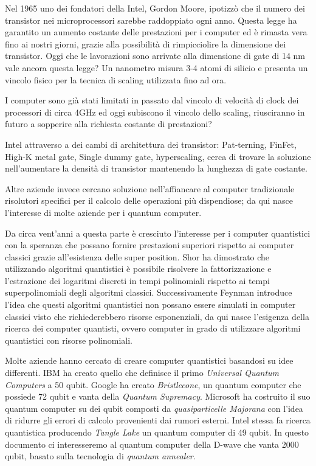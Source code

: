 \cite{S24}Nel 1965 uno dei fondatori della Intel, Gordon Moore, ipotizzò che il numero dei transistor nei microprocessori sarebbe raddoppiato ogni anno. Questa legge ha garantito un aumento costante delle prestazioni per i computer ed è rimasta vera fino ai nostri giorni, grazie alla possibilità di rimpicciolire la dimensione dei transistor. Oggi che le lavorazioni sono arrivate alla dimensione di gate di 14 nm vale ancora questa legge? Un nanometro misura 3-4 atomi di silicio e presenta un vincolo fisico per la tecnica di scaling utilizzata fino ad ora.

I computer sono già stati limitati in passato dal vincolo di velocità di clock dei processori di circa 4GHz ed oggi subiscono il vincolo dello scaling, riusciranno in futuro a sopperire alla richiesta costante di prestazioni?

Intel attraverso a dei cambi di architettura dei transistor: Pat-terning, FinFet, High-K metal gate, Single dummy gate, hyperscaling, cerca di trovare la soluzione nell'aumentare la densità di transistor mantenendo la lunghezza di gate costante.

Altre aziende invece cercano soluzione nell'affiancare al computer tradizionale risolutori specifici per il calcolo delle operazioni più dispendiose; da qui nasce l'interesse di molte aziende per i quantum computer.

\cite{NAC}Da circa vent'anni a questa parte è cresciuto l'interesse per i computer quantistici con la speranza che possano fornire prestazioni superiori rispetto ai computer classici grazie all'esistenza delle super position. Shor ha dimostrato che utilizzando algoritmi quantistici è possibile risolvere la fattorizzazione e l'estrazione dei logaritmi discreti in tempi polinomiali rispetto ai tempi superpolinomiali degli algoritmi classici. Successivamente Feynman introduce l'idea che questi algoritmi quantistici non possano essere simulati in computer classici visto che richiederebbero risorse esponenziali, da qui nasce l'esigenza della ricerca dei computer quantisti, ovvero computer in grado di utilizzare algoritmi quantistici con risorse polinomiali.

Molte aziende hanno cercato di creare computer quantistici basandosi su idee differenti. IBM ha creato quello che definisce il primo \textit{Universal Quantum Computers} a 50 qubit. Google ha creato \textit{Bristlecone}, un quantum computer che possiede 72 qubit e vanta della \textit{Quantum Supremacy}\cite{QS}. Microsoft ha costruito il suo quantum computer su dei qubit composti da \textit{quasiparticelle Majorana} con l'idea di ridurre gli errori di calcolo provenienti dai rumori esterni\cite{MA}. Intel stessa fa ricerca quantistica producendo \textit{Tangle Lake} un quantum computer di 49 qubit\cite{Q49}. In questo documento ci interesseremo al quantum computer della D-wave che vanta 2000 qubit, basato sulla tecnologia di \textit{quantum annealer}.
